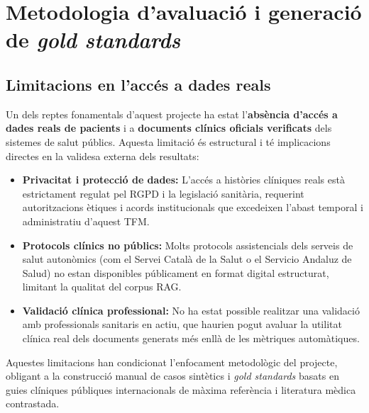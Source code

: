 \documentclass[CAT]{TFUOC}%
\begin{document}
\section{Metodologia d'avaluació i generació de \textit{gold standards}}

\subsection{Limitacions en l'accés a dades reals}

Un dels reptes fonamentals d'aquest projecte ha estat l'\textbf{absència d'accés a dades reals de pacients} i a \textbf{documents clínics oficials verificats} dels sistemes de salut públics. Aquesta limitació és estructural i té implicacions directes en la validesa externa dels resultats:

\begin{itemize}
    \item \textbf{Privacitat i protecció de dades:} L'accés a històries clíniques reals està estrictament regulat pel RGPD i la legislació sanitària, requerint autoritzacions ètiques i acords institucionals que excedeixen l'abast temporal i administratiu d'aquest TFM.
    
    \item \textbf{Protocols clínics no públics:} Molts protocols assistencials dels serveis de salut autonòmics (com el Servei Català de la Salut o el Servicio Andaluz de Salud) no estan disponibles públicament en format digital estructurat, limitant la qualitat del corpus RAG.
    
    \item \textbf{Validació clínica professional:} No ha estat possible realitzar una validació amb professionals sanitaris en actiu, que haurien pogut avaluar la utilitat clínica real dels documents generats més enllà de les mètriques automàtiques.
\end{itemize}

Aquestes limitacions han condicionat l'enfocament metodològic del projecte, obligant a la construcció manual de casos sintètics i \textit{gold standards} basats en guies clíniques públiques internacionals de màxima referència i literatura mèdica contrastada. 
\end{document}
